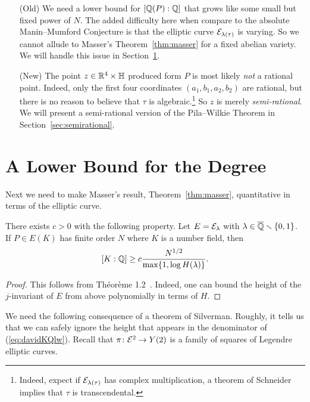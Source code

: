 \begin{enumerate}
\item [(Old)] We need a lower bound for $[{\mathbb{Q}}(P):{\mathbb{Q}}]$ that grows like
  some small but fixed power of $N$. The added difficulty here when
  compare to the absolute Manin--Mumford Conjecture is that the
  elliptic curve ${\mathcal E}_{\lambda(\tau)}$ is varying. So we cannot allude
  to Masser's Theorem~\ref{thm:masser} for a fixed abelian variety.
  We will handle this issue in
  Section~\ref{sec:lbdegrel}. 
  
\item[(New)] The point $z\in {\mathbb{R}}^4\times{\mathbb{H}}$ produced form $P$ is
  most likely \emph{not} a rational point. Indeed, only the first four
  coordinates $(a_1,b_1,a_2,b_2)$ are rational, but there is no
  reason to believe that $\tau$ is algebraic.\footnote{Indeed,
    expect if ${\mathcal E}_{\lambda(\tau)}$ has complex multiplication, a
    theorem of Schneider implies that $\tau$ is transcendental.}
  So  $z$ is merely \textit{semi-rational}. We will present a
  semi-rational version of the Pila--Wilkie Theorem in
  Section~\ref{sec:semirational}. 
\end{enumerate}

\section{A Lower Bound for the Degree}
\label{sec:lbdegrel}

Next we need to make Masser's result, Theorem~\ref{thm:masser},
quantitative in terms of the elliptic curve.

\begin{theorem}[David]
  There exists $c>0$ with the following property. 
  Let $E={\mathcal E}_\lambda$ with $\lambda\in{\overline{\mathbb{Q}}}\smallsetminus\{0,1\}$. If $P\in
  E(K)$ has finite order $N$ where $K$ is a number field, then
  \begin{equation}
    \label{eq:davidKQlb}
    [K:{\mathbb{Q}}] \ge c \frac{N^{1/2}}{\max\{1,\log H(\lambda)\}}.
  \end{equation}    
\end{theorem}
\begin{proof}
  This follows from Th\'eor\`eme 1.2~\cite{DavidPetiteHauteur}.
  Indeed, one can bound
  the height of the $j$-invariant of $E$ from above polynomially in
  terms of $H$. 
\end{proof}

We need the following consequence of a theorem of Silverman. Roughly,
it tells us that we can safely ignore the height that appears in the
denominator of (\ref{eq:davidKQlw}). Recall that $\pi\colon
{\mathcal E}^2\rightarrow Y(2)$ is a family of squares of Legendre elliptic
curves.

